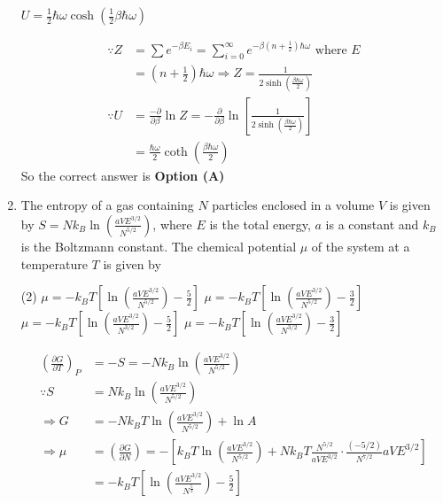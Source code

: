 \begin{enumerate}
\begin{tasks}
\task[\textbf{D.}] $U=\frac{1}{2} \hbar \omega \cosh \left(\frac{1}{2} \beta \hbar \omega\right)$
\end{tasks}
\begin{answer}
\begin{align*}
\because Z&=\sum e^{-\beta E_{i}}=\sum_{i=0}^{\infty} e^{-\beta\left(n+\frac{1}{2}\right) \hbar \omega}\text{ where }E\\&=\left(n+\frac{1}{2}\right) \hbar \omega \Rightarrow Z=\frac{1}{2 \sinh \left(\frac{\beta \hbar \omega}{2}\right)}\\
\because U&=\frac{-\partial}{\partial \beta} \ln Z=-\frac{\partial}{\partial \beta} \ln \left[\frac{1}{2 \sinh \left(\frac{\beta \hbar \omega}{2}\right)}\right]\\&=\frac{\hbar \omega}{2} \operatorname{coth}\left(\frac{\beta \hbar \omega}{2}\right)
\end{align*}
So the correct answer is \textbf{Option (A)}
\end{answer}	
\item  The entropy of a gas containing $N$ particles enclosed in a volume $V$ is given by $S=N k_{B} \ln \left(\frac{a V E^{3 / 2}}{N^{5 / 2}}\right)$, where $E$ is the total energy, $a$ is a constant and $k_{B}$ is the Boltzmann constant. The chemical potential $\mu$ of the system at a temperature $T$ is given by
{}
\begin{tasks}(2)
\task[\textbf{A.}] $\mu=-k_{B} T\left[\ln \left(\frac{a V E^{3 / 2}}{N^{5 / 2}}\right)-\frac{5}{2}\right]$
\task[\textbf{B.}] $\mu=-k_{B} T\left[\ln \left(\frac{a V E^{3 / 2}}{N^{5 / 2}}\right)-\frac{3}{2}\right]$
\task[\textbf{C.}] $\mu=-k_{B} T\left[\ln \left(\frac{a V E^{3 / 2}}{N^{3 / 2}}\right)-\frac{5}{2}\right]$
\task[\textbf{D.}] $\mu=-k_{B} T\left[\ln \left(\frac{a V E^{3 / 2}}{N^{3 / 2}}\right)-\frac{3}{2}\right]$
\end{tasks}
\begin{answer}
\begin{align*}
\left(\frac{\partial G}{\partial T}\right)_{P}&=-S=-N k_{B} \ln \left(\frac{a V E^{3 / 2}}{N^{5 / 2}}\right)\\ \because S&=N k_{B} \ln \left(\frac{a V E^{3 / 2}}{N^{5 / 2}}\right)\\
\Rightarrow G&=-N k_{B} T \ln \left(\frac{a V E^{3 / 2}}{N^{5 / 2}}\right)+\ln A\\
\Rightarrow \mu&=\left(\frac{\partial G}{\partial N}\right)=-\left[k_{B} T \ln \left(\frac{a V E^{3 / 2}}{N^{5 / 2}}\right)+N k_{B} T \frac{N^{5 / 2}}{a V E^{3 / 2}} \cdot \frac{(-5 / 2)}{N^{7 / 2}} a V E^{3 / 2}\right]\\&=-k_{B} T\left[\ln \left(\frac{a V E^{3 / 2}}{N^{\frac{5}{2}}}\right)-\frac{5}{2}\right]

\end{align*}
\end{answer}
\end{enumerate}
